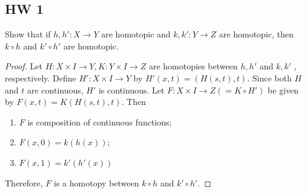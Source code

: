 \documentclass{article}
\begin{document}
\begin{multicols}{2}
\raggedcolumns

\section{HW 1}
\begin{exercise}
Show that if $h,h':X\to Y$ are homotopic and $k,k':Y\to Z$ are homotopic, then $k\circ h$ and $k'\circ h'$ are homotopic.
\end{exercise}
\begin{proof}
Let $H:X\times I\to Y, K:Y\times I\to Z$ are homotopies between $h,h'$ and $k,k'$ , respectively. Define $H':X\times I\to Y$ by $H'(x,t) = (H(s,t),t)$. Since both $H$ and $t$ are continuous, $H'$ is continuous. Let $F:X\times I\to Z(=K\circ H')$ be given by $F(x,t) = K(H(s,t),t)$. Then
\begin{enumerate}[label={(\alph*)}]
\item $F$ is composition of continuous functions;
\item $F(x,0) = k(h(x))$;
\item $F(x,1)=k'(h'(x))$
\end{enumerate}
Therefore, $F$ is a homotopy between $k\circ h$ and $k'\circ h'$.
\end{proof}


\end{multicols}
\end{document}
